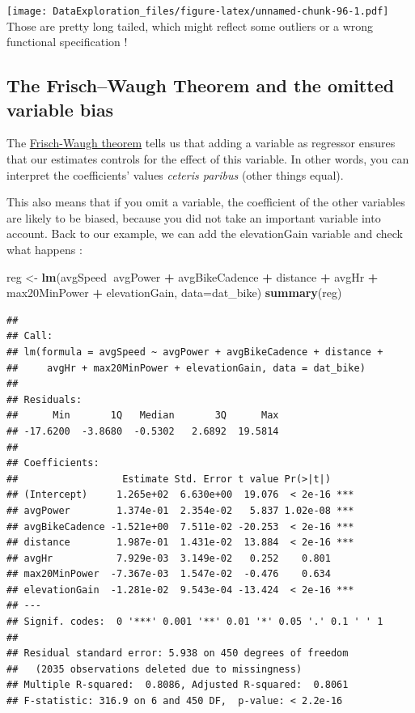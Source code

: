 \documentclass[
]{book}
\newenvironment{Shaded}{\begin{snugshade}}{\end{snugshade}}
\newcommand{\DataTypeTok}[1]{\textcolor[rgb]{0.13,0.29,0.53}{#1}}
\newcommand{\KeywordTok}[1]{\textcolor[rgb]{0.13,0.29,0.53}{\textbf{#1}}}
\newcommand{\NormalTok}[1]{#1}
\newcommand{\OperatorTok}[1]{\textcolor[rgb]{0.81,0.36,0.00}{\textbf{#1}}}
\newcommand{\StringTok}[1]{\textcolor[rgb]{0.31,0.60,0.02}{#1}}
\begin{document}
\texttt{[image: DataExploration\_files/figure-latex/unnamed-chunk-96-1.pdf]}
Those are pretty long tailed, which might reflect some outliers or a wrong functional specification !

\hypertarget{the-frischwaugh-theorem-and-the-omitted-variable-bias}{%
\subsection{The Frisch--Waugh Theorem and the omitted variable bias}\label{the-frischwaugh-theorem-and-the-omitted-variable-bias}}

The \href{https://en.wikipedia.org/wiki/Frisch\%E2\%80\%93Waugh\%E2\%80\%93Lovell_theorem}{Frisch-Waugh theorem} tells us that adding a variable as regressor ensures that our estimates controls for the effect of this variable. In other words, you can interpret the coefficients' values \emph{ceteris paribus} (other things equal).

This also means that if you omit a variable, the coefficient of the other variables are likely to be biased, because you did not take an important variable into account. Back to our example, we can add the elevationGain variable and check what happens :

\begin{Shaded}
\begin{Highlighting}[]
\NormalTok{reg <-}\StringTok{ }\KeywordTok{lm}\NormalTok{(avgSpeed}\OperatorTok{~}\NormalTok{avgPower }\OperatorTok{+}\StringTok{ }\NormalTok{avgBikeCadence }\OperatorTok{+}\StringTok{ }\NormalTok{distance }\OperatorTok{+}\StringTok{ }\NormalTok{avgHr }\OperatorTok{+}\StringTok{ }\NormalTok{max20MinPower }\OperatorTok{+}\StringTok{ }\NormalTok{elevationGain, }\DataTypeTok{data=}\NormalTok{dat_bike)}
\KeywordTok{summary}\NormalTok{(reg)}
\end{Highlighting}
\end{Shaded}

\begin{verbatim}
## 
## Call:
## lm(formula = avgSpeed ~ avgPower + avgBikeCadence + distance + 
##     avgHr + max20MinPower + elevationGain, data = dat_bike)
## 
## Residuals:
##      Min       1Q   Median       3Q      Max 
## -17.6200  -3.8680  -0.5302   2.6892  19.5814 
## 
## Coefficients:
##                  Estimate Std. Error t value Pr(>|t|)    
## (Intercept)     1.265e+02  6.630e+00  19.076  < 2e-16 ***
## avgPower        1.374e-01  2.354e-02   5.837 1.02e-08 ***
## avgBikeCadence -1.521e+00  7.511e-02 -20.253  < 2e-16 ***
## distance        1.987e-01  1.431e-02  13.884  < 2e-16 ***
## avgHr           7.929e-03  3.149e-02   0.252    0.801    
## max20MinPower  -7.367e-03  1.547e-02  -0.476    0.634    
## elevationGain  -1.281e-02  9.543e-04 -13.424  < 2e-16 ***
## ---
## Signif. codes:  0 '***' 0.001 '**' 0.01 '*' 0.05 '.' 0.1 ' ' 1
## 
## Residual standard error: 5.938 on 450 degrees of freedom
##   (2035 observations deleted due to missingness)
## Multiple R-squared:  0.8086,	Adjusted R-squared:  0.8061 
## F-statistic: 316.9 on 6 and 450 DF,  p-value: < 2.2e-16
\end{verbatim}
\end{document}
